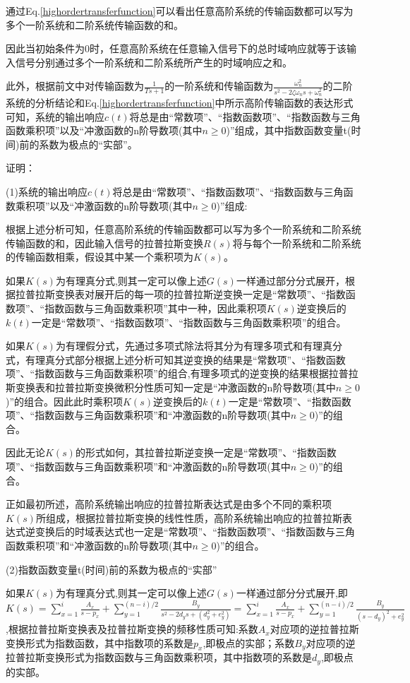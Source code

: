 \documentclass{article}
\numberwithin{equation}{section}
\numberwithin{figure}{section}
\begin{document}
通过Eq.\ref{highordertransferfunction}可以看出任意高阶系统的传输函数都可以写为多个一阶系统和二阶系统传输函数的和。

因此当初始条件为0时，任意高阶系统在任意输入信号下的总时域响应就等于该输入信号分别通过多个一阶系统和二阶系统所产生的时域响应之和。

此外，根据前文中对传输函数为$\frac{1}{Ts+1}$的一阶系统和传输函数为$\frac{\omega_n^2}{s^2-2\zeta\omega_ns+\omega_n^2}$的二阶系统的分析结论和Eq.\ref{highordertransferfunction}中所示高阶传输函数的表达形式可知，系统的输出响应$c(t)$将总是由“常数项”、“指数函数项”、“指数函数与三角函数乘积项”以及“冲激函数的n阶导数项(其中$n≥0$)”组成，其中指数函数变量t(时间)前的系数为极点的“实部”。

证明：

(1)系统的输出响应$c(t)$将总是由“常数项”、“指数函数项”、“指数函数与三角函数乘积项”以及“冲激函数的n阶导数项(其中$n≥0$)”组成:

根据上述分析可知，任意高阶系统的传输函数都可以写为多个一阶系统和二阶系统传输函数的和，因此输入信号的拉普拉斯变换$R(s)$将与每个一阶系统和二阶系统的传输函数相乘，假设其中某一个乘积项为$K(s)$。

如果$K(s)$为有理真分式,则其一定可以像上述$G(s)$一样通过部分分式展开，根据拉普拉斯变换表对展开后的每一项的拉普拉斯逆变换一定是“常数项”、“指数函数项”、“指数函数与三角函数乘积项”其中一种，因此乘积项$K(s)$逆变换后的$k(t)$一定是“常数项”、“指数函数项”、“指数函数与三角函数乘积项”的组合。

如果$K(s)$为有理假分式，先通过多项式除法将其分为有理多项式和有理真分式，有理真分式部分根据上述分析可知其逆变换的结果是“常数项”、“指数函数项”、“指数函数与三角函数乘积项”的组合,有理多项式的逆变换的结果根据拉普拉斯变换表和拉普拉斯变换微积分性质可知一定是“冲激函数的n阶导数项(其中$n≥0$)”的组合。因此此时乘积项$K(s)$逆变换后的$k(t)$一定是“常数项”、“指数函数项”、“指数函数与三角函数乘积项”和“冲激函数的n阶导数项(其中$n≥0$)”的组合。

因此无论$K(s)$的形式如何，其拉普拉斯逆变换一定是“常数项”、“指数函数项”、“指数函数与三角函数乘积项”和“冲激函数的n阶导数项(其中$n≥0$)”的组合。

正如最初所述，高阶系统输出响应的拉普拉斯表达式是由多个不同的乘积项$K(s)$所组成，根据拉普拉斯变换的线性性质，高阶系统输出响应的拉普拉斯表达式逆变换后的时域表达式也一定是“常数项”、“指数函数项”、“指数函数与三角函数乘积项”和“冲激函数的n阶导数项(其中$n≥0$)”的组合。

(2)指数函数变量t(时间)前的系数为极点的“实部”

如果$K(s)$为有理真分式,则其一定可以像上述$G(s)$一样通过部分分式展开,即$K(s)=\sum_{x = 1}^{i}\frac{A_x}{s-p_x}+\sum_{y = 1}^{(n-i)/2}\frac{B_y}{s^2-2d_ys+(d_y^2+e_y^2)}=\sum_{x = 1}^{i}\frac{A_x}{s-p_x}+\sum_{y = 1}^{(n-i)/2}\frac{B_y}{(s-d_y)^2+e_y^2}$,根据拉普拉斯变换表及拉普拉斯变换的频移性质可知:系数$A_x$对应项的逆拉普拉斯变换形式为指数函数，其中指数项的系数是$p_x$,即极点的实部；系数$B_y$对应项的逆拉普拉斯变换形式为指数函数与三角函数乘积项，其中指数项的系数是$d_y$,即极点的实部。
\end{document}
